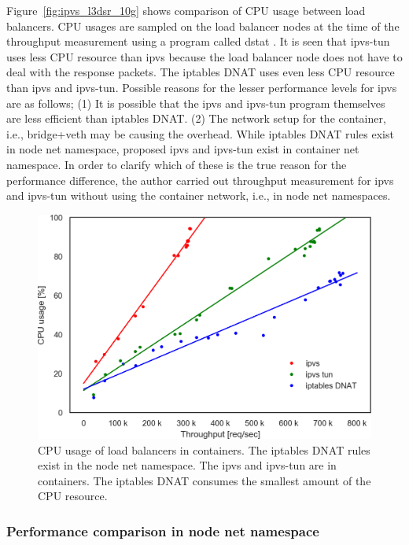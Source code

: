 Figure~\ref{fig:ipvs_l3dsr_10g} shows comparison of CPU usage between load balancers.
CPU usages are sampled on the load balancer nodes at the time of the throughput measurement using a program called dstat \cite{wieers2019dstat}.
It is seen that ipvs-tun uses less CPU resource than ipvs because the load balancer node does not have to deal with the response packets.
The iptables DNAT uses even less CPU resource than ipvs and ipvs-tun.
Possible reasons for the lesser performance levels for ipvs are as follows;
(1) It is possible that the ipvs and ipvs-tun program themselves are less efficient than iptables DNAT.
(2) The network setup for the container, i.e., bridge+veth may be causing the overhead.
While iptables DNAT rules exist in node net namespace, proposed ipvs and ipvs-tun exist in container net namespace.
In order to clarify which of these is the true reason for the performance difference, the author carried out throughput measurement for ipvs and ipvs-tun without using the container network, i.e., in node net namespaces.

\begin{figure}[h]
  \centering
  \includegraphics[width=0.8\columnwidth]{Figs/cpu_usage_10g}
  \par\bigskip
  \centering
  \begin{minipage}{0.9\columnwidth}
    \caption[CPU usage of load balancers in containers]{
      CPU usage of load balancers in containers.
      The iptables DNAT rules exist in the node net namespace.
      The ipvs and ipvs-tun are in containers.
      The iptables DNAT consumes the smallest amount of the CPU resource.
    }
    \label{fig:cpu_usage_10g}
  \end{minipage}
\end{figure}

\FloatBarrier

\subsubsection{Performance comparison in node net namespace}

